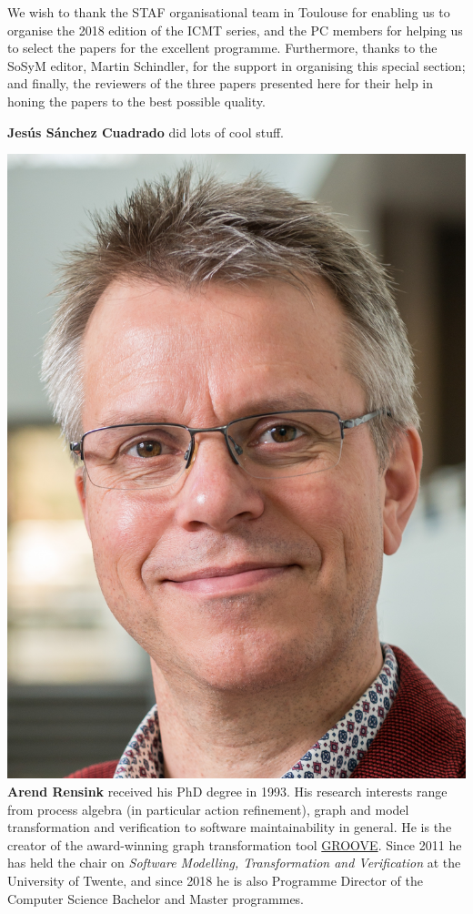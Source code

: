 \documentclass[twocolumn,final]{svjour3}
\begin{document}
\begin{acknowledgements}
We wish to thank the STAF organisational team in Toulouse for enabling us to organise the 2018 edition of the ICMT series, and the PC members for helping us to select the papers for the excellent programme. Furthermore, thanks to the SoSyM editor, Martin Schindler, for the support in organising this special section; and finally, the reviewers of the three papers presented here for their help in honing the papers to the best possible quality.
\end{acknowledgements}


\nocite{*}



\noindent \textbf{Jesús Sánchez Cuadrado} did lots of cool stuff.

\medskip\noindent\includegraphics[width=.2\textwidth]{arend}
\noindent \textbf{Arend Rensink} received his PhD degree in 1993. His research interests range from process algebra (in particular action refinement), graph and model transformation and verification to software maintainability in general. He is the creator of the award-winning graph transformation tool \href{https://sf.net/projects/groove}{GROOVE}. Since 2011 he has held the chair on \emph{Software Modelling, Transformation and Verification} at the University of Twente, and since 2018 he is also Programme Director of the Computer Science Bachelor and Master programmes.
\end{document}
